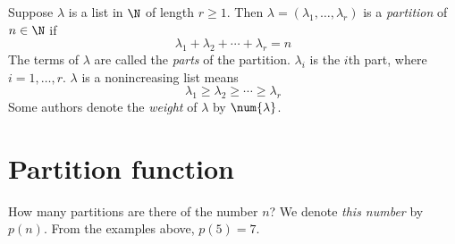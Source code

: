 Suppose $\lambda $ is a list in $\N  $ of length $r \geq 1$.
Then $\lambda  = (\lambda _1, \dots , \lambda _r)$ is a \textit{partition} of $n \in \N  $ if
    \[
\lambda _1 + \lambda _2 + \cdots + \lambda _r = n
    \]
The terms of $\lambda $ are called the \textit{parts} of the partition.
$\lambda _i$ is the $i$th part, where $i = 1, \dots , r$.
$\lambda $ is a nonincreasing list means
    \[
\lambda _1 \geq \lambda _2 \geq \cdots \geq \lambda _r
    \]
Some authors denote the \textit{weight} of $\lambda $ by $\num{\lambda }$.

\section*{Partition function}

How many partitions are there of the number $n$?
We denote \textit{this number} by $p(n).$
From the examples above, $p(5) = 7$.

\blankpage